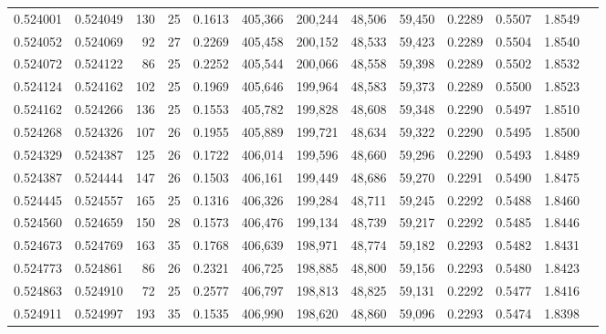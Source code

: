 \begin{tabular}{rrrrrrrrrrrrr}
0.524001 & 0.524049 & 130 &  25 &                                     0.1613 & 405,366 & 200,244 &  48,506 &  59,450 & 0.2289 & 0.5507 & 1.8549 \\
0.524052 & 0.524069 &  92 &  27 &                                     0.2269 & 405,458 & 200,152 &  48,533 &  59,423 & 0.2289 & 0.5504 & 1.8540 \\
0.524072 & 0.524122 &  86 &  25 &                                     0.2252 & 405,544 & 200,066 &  48,558 &  59,398 & 0.2289 & 0.5502 & 1.8532 \\
0.524124 & 0.524162 & 102 &  25 &                                     0.1969 & 405,646 & 199,964 &  48,583 &  59,373 & 0.2289 & 0.5500 & 1.8523 \\
0.524162 & 0.524266 & 136 &  25 &                                     0.1553 & 405,782 & 199,828 &  48,608 &  59,348 & 0.2290 & 0.5497 & 1.8510 \\
0.524268 & 0.524326 & 107 &  26 &                                     0.1955 & 405,889 & 199,721 &  48,634 &  59,322 & 0.2290 & 0.5495 & 1.8500 \\
0.524329 & 0.524387 & 125 &  26 &                                     0.1722 & 406,014 & 199,596 &  48,660 &  59,296 & 0.2290 & 0.5493 & 1.8489 \\
0.524387 & 0.524444 & 147 &  26 &                                     0.1503 & 406,161 & 199,449 &  48,686 &  59,270 & 0.2291 & 0.5490 & 1.8475 \\
0.524445 & 0.524557 & 165 &  25 &                                     0.1316 & 406,326 & 199,284 &  48,711 &  59,245 & 0.2292 & 0.5488 & 1.8460 \\
0.524560 & 0.524659 & 150 &  28 &                                     0.1573 & 406,476 & 199,134 &  48,739 &  59,217 & 0.2292 & 0.5485 & 1.8446 \\
0.524673 & 0.524769 & 163 &  35 &                                     0.1768 & 406,639 & 198,971 &  48,774 &  59,182 & 0.2293 & 0.5482 & 1.8431 \\
0.524773 & 0.524861 &  86 &  26 &                                     0.2321 & 406,725 & 198,885 &  48,800 &  59,156 & 0.2293 & 0.5480 & 1.8423 \\
0.524863 & 0.524910 &  72 &  25 &                                     0.2577 & 406,797 & 198,813 &  48,825 &  59,131 & 0.2292 & 0.5477 & 1.8416 \\
0.524911 & 0.524997 & 193 &  35 &                                     0.1535 & 406,990 & 198,620 &  48,860 &  59,096 & 0.2293 & 0.5474 & 1.8398 \\

\end{tabular}
